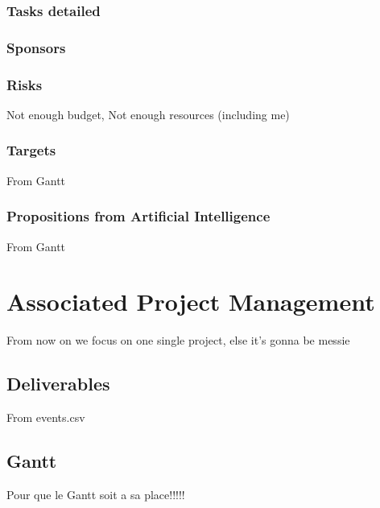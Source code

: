 \documentclass[8pt]{article} %
\begin{document}
\subsubsection{Tasks detailed}
{\footnotesize


}

\subsubsection{Sponsors}

\subsubsection{Risks}
Not enough budget, Not enough resources (including me)
\subsubsection{Targets}
From Gantt
\subsubsection{Propositions from Artificial Intelligence}
From Gantt


\section{Associated Project Management}

From now on we focus on one single project, else it's gonna be messie 
\subsection{Deliverables}
From events.csv
\subsection{Gantt}
Pour que le Gantt soit a sa place!!!!!

\end{document}
